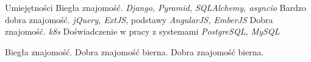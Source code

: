 \begin{rubric}{Umiejętności}
\entry*[Python]
	Biegła znajomość.\newline
    \textit{Django, Pyramid, SQLAlchemy, asyncio}
\entry*[JavaScript]
	Bardzo dobra znajomość.\newline
    \textit{jQuery, ExtJS}, podstawy \textit{AngularJS, EmberJS}
\entry*[Go]
	Dobra  znajomość.\newline
    \textit{k8s}
    Doświadczenie w pracy z systemami \textit{PostgreSQL, MySQL}

\entry*[Angielski]
	Biegła znajomość.
\entry*[Rosyjski]
	Dobra znajomość bierna.
\entry*[Cerkiewnosłowiański]
	Dobra znajomość bierna.
\end{rubric}

